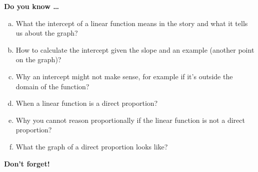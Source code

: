 \newpage



\bigskip

\noindent \textbf{Do you know \ldots} %

\begin{enumerate} [(a)]
\item What the intercept of a linear function means in the story and what it tells us about the graph? 
\item How to calculate the intercept given the slope and an example (another point on the graph)? 
\item Why an intercept might not make sense, for example if it's outside the domain of the function? 
\item When a linear function is a direct proportion? 
\item Why you cannot reason proportionally if the linear function is not a direct proportion? 
\item What the graph of a direct proportion looks like? 
\end{enumerate}

\bigskip

\noindent \textbf{Don't forget!}
